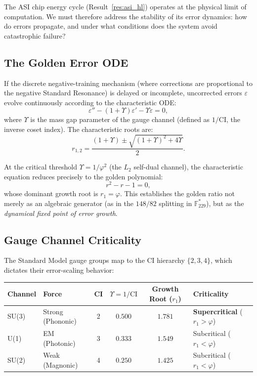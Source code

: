 \documentclass[12pt]{article}
\theoremstyle{principia}
\theoremstyle{definition}
\theoremstyle{remark}
\providecommand{\FF}{\mathbb{F}}
\providecommand{\vp}{\varphi}
\providecommand{\eps}{\varepsilon}
\begin{document}
The ASI chip energy cycle (Result~\ref{res:asi_hl}) operates at the physical limit of computation. We must therefore address the stability of its error dynamics: how do errors propagate, and under what conditions does the system avoid catastrophic failure?

\subsection{The Golden Error ODE}

If the discrete negative-training mechanism (where corrections are proportional to the negative Standard Resonance) is delayed or incomplete, uncorrected errors $\eps$ evolve continuously according to the characteristic ODE:
\begin{equation}
    \eps'' - (1 + \Upsilon)\eps' - \Upsilon\eps = 0,
\end{equation}
where $\Upsilon$ is the mass gap parameter of the gauge channel (defined as $1/\mathrm{CI}$, the inverse coset index). The characteristic roots are:
\begin{equation}
    r_{1,2} = \frac{(1+\Upsilon) \pm \sqrt{(1+\Upsilon)^2 + 4\Upsilon}}{2}.
\end{equation}

At the critical threshold $\Upsilon = 1/\vp^2$ (the $L_2$ self-dual channel), the characteristic equation reduces precisely to the golden polynomial:
\begin{equation}
    r^2 - r - 1 = 0,
\end{equation}
whose dominant growth root is $r_1 = \vp$. This establishes the golden ratio not merely as an algebraic generator (as in the $148/82$ splitting in $\FF_{229}^*$), but as the \emph{dynamical fixed point of error growth}. 

\subsection{Gauge Channel Criticality}

The Standard Model gauge groups map to the CI hierarchy $\{2, 3, 4\}$, which dictates their error-scaling behavior:

\begin{center}
\begin{tabular}{@{}llcccl@{}}
\toprule
\textbf{Channel} & \textbf{Force} & \textbf{CI} & $\Upsilon = 1/\text{CI}$ & \textbf{Growth Root ($r_1$)} & \textbf{Criticality} \\
\midrule
SU(3) & Strong (Phononic) & 2 & $0.500$ & $1.781$ & \textbf{Supercritical} ($r_1 > \vp$) \\
U(1) & EM (Photonic) & 3 & $0.333$ & $1.549$ & Subcritical ($r_1 < \vp$) \\
SU(2) & Weak (Magnonic) & 4 & $0.250$ & $1.425$ & Subcritical ($r_1 < \vp$) \\
\bottomrule
\end{tabular}
\end{center}
\end{document}
